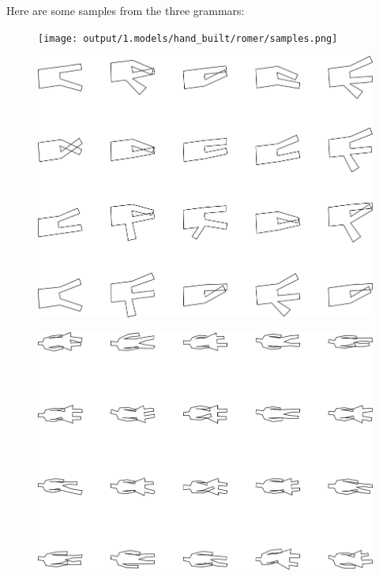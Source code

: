 
Here are some samples from the three grammars:
\begin{figure}
\texttt{[image: output/1.models/hand\_built/romer/samples.png]}
\end{figure}

\begin{figure}
\includegraphics[width=\linewidth]{output/1.models/hand_built/hand/samples.png}
\end{figure}

\begin{figure}
\includegraphics[width=\linewidth]{output/1.models/hand_built/romerchoice/samples.png}
\end{figure}


